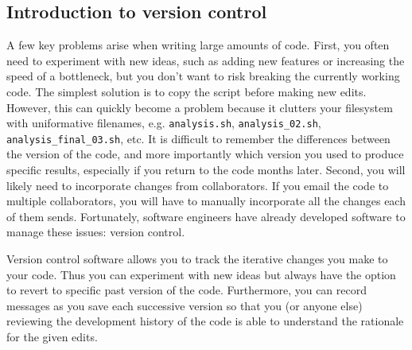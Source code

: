 \subsection{Introduction to version control}

A few key problems arise when writing large amounts of code. First, you often need to experiment with new ideas, such as adding new features or increasing the speed of a bottleneck, but you don't want to risk breaking the currently working code. The simplest solution is to copy the script before making new edits. However, this can quickly become a problem because it clutters your filesystem with uniformative filenames, e.g. \verb|analysis.sh|, \verb|analysis_02.sh|, \verb|analysis_final_03.sh|, etc. It is difficult to remember the differences between the version of the code, and more importantly which version you used to produce specific results, especially if you return to the code months later. Second, you will likely need to incorporate changes from collaborators. If you email the code to multiple collaborators, you will have to manually incorporate all the changes each of them sends. Fortunately, software engineers have already developed software to manage these issues: version control.

Version control software allows you to track the iterative changes you make to your code. Thus you can experiment with new ideas but always have the option to revert to specific past version of the code. Furthermore, you can record messages as you save each successive version so that you (or anyone else) reviewing the development history of the code is able to understand the rationale for the given edits.